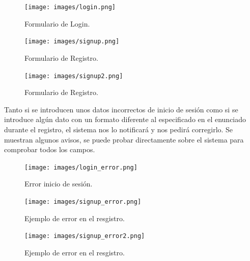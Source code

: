 \documentclass[12pt, twoside]{report}
\begin{document}
\begin{figure}[h]
\begin{center}
\texttt{[image: images/login.png]}
\end{center}
\caption{\label{inicio} Formulario de Login.}
\end{figure}
\clearpage
\begin{figure}[h]
\begin{center}
\texttt{[image: images/signup.png]}
\end{center}
\caption{\label{inicio} Formulario de Registro.}
\end{figure}
\begin{figure}[h]
\begin{center}
\texttt{[image: images/signup2.png]}
\end{center}
\caption{\label{inicio} Formulario de Registro.}
\end{figure}
\clearpage
\noindent Tanto si se introducen unos datos incorrectos de inicio de sesión como si se introduce algún dato con un formato diferente al especificado en el enunciado durante el registro, el sistema nos lo notificará y nos pedirá corregirlo. Se muestran algunos avisos, se puede probar directamente sobre el sistema para comprobar todos los campos.\\
\begin{figure}[h]
\begin{center}
\texttt{[image: images/login\_error.png]}
\end{center}
\caption{\label{inicio} Error inicio de sesión.}
\end{figure}
\begin{figure}[h]
\begin{center}
\texttt{[image: images/signup\_error.png]}
\end{center}
\caption{\label{inicio} Ejemplo de error en el resgistro.}
\end{figure}
\begin{figure}[h]
\begin{center}
\texttt{[image: images/signup\_error2.png]}
\end{center}
\caption{\label{inicio} Ejemplo de error en el resgistro.}
\end{figure}
\clearpage
\end{document}
